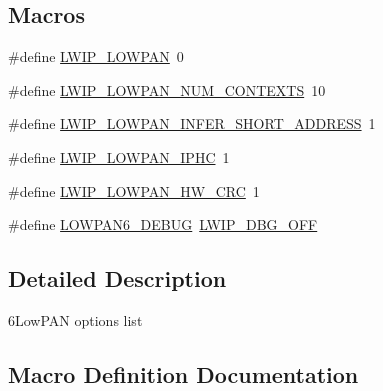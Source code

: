 \subsection*{Macros}
\begin{DoxyCompactItemize}
\item 
\#define \hyperlink{openmote-cc2538_2lwip_2src_2include_2netif_2lowpan6__opts_8h_ab16b772237b292c012352c01d2b87b2b}{L\+W\+I\+P\+\_\+L\+O\+W\+P\+AN}~0
\item 
\#define \hyperlink{openmote-cc2538_2lwip_2src_2include_2netif_2lowpan6__opts_8h_a4ffa89f39abf93cc599f78c5a8bb0a4a}{L\+W\+I\+P\+\_\+L\+O\+W\+P\+A\+N\+\_\+\+N\+U\+M\+\_\+\+C\+O\+N\+T\+E\+X\+TS}~10
\item 
\#define \hyperlink{openmote-cc2538_2lwip_2src_2include_2netif_2lowpan6__opts_8h_a6a542cd72a6270b7231b8b93f8041207}{L\+W\+I\+P\+\_\+L\+O\+W\+P\+A\+N\+\_\+\+I\+N\+F\+E\+R\+\_\+\+S\+H\+O\+R\+T\+\_\+\+A\+D\+D\+R\+E\+SS}~1
\item 
\#define \hyperlink{openmote-cc2538_2lwip_2src_2include_2netif_2lowpan6__opts_8h_a0f178a86d02e0ba4168cafe3de5f3afa}{L\+W\+I\+P\+\_\+L\+O\+W\+P\+A\+N\+\_\+\+I\+P\+HC}~1
\item 
\#define \hyperlink{openmote-cc2538_2lwip_2src_2include_2netif_2lowpan6__opts_8h_a1a3b434a3a762cb461de5ff1d844dba3}{L\+W\+I\+P\+\_\+L\+O\+W\+P\+A\+N\+\_\+\+H\+W\+\_\+\+C\+RC}~1
\item 
\#define \hyperlink{openmote-cc2538_2lwip_2src_2include_2netif_2lowpan6__opts_8h_a8feb12c777fb966c51417d05cd6820bd}{L\+O\+W\+P\+A\+N6\+\_\+\+D\+E\+B\+UG}~\hyperlink{group__debugging__levels_gadab1cdc3f45939a3a5c9a3d7e04987e1}{L\+W\+I\+P\+\_\+\+D\+B\+G\+\_\+\+O\+FF}
\end{DoxyCompactItemize}


\subsection{Detailed Description}
6\+Low\+P\+AN options list 

\subsection{Macro Definition Documentation}
\mbox{\label{openmote-cc2538_2lwip_2src_2include_2netif_2lowpan6__opts_8h_a8feb12c777fb966c51417d05cd6820bd}} 
